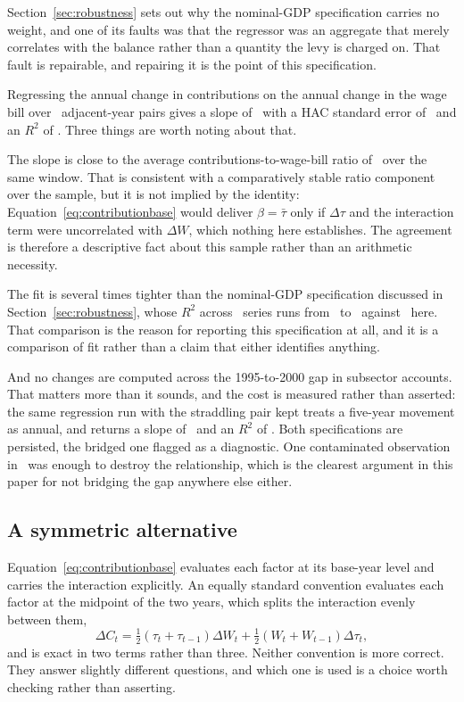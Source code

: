 Section~\ref{sec:robustness} sets out why the nominal-GDP specification carries no weight,
and one of its faults was that the regressor was an aggregate that merely correlates with
the balance rather than a quantity the levy is charged on. That fault is repairable, and
repairing it is the point of this specification.

Regressing the annual change in contributions on the annual change in the wage bill over
\WageBillObservations\ adjacent-year pairs gives a slope of \WageBillSlope\ with a HAC
standard error of \WageBillSlopeSe\ and an $R^2$ of \WageBillRSquared. Three things are
worth noting about that.

The slope is close to the average contributions-to-wage-bill ratio of \RatioMean\
over the same window.
That is consistent with a comparatively stable ratio component over the sample, but it is
not implied by the identity: Equation~\eqref{eq:contributionbase} would deliver
$\beta = \bar{\tau}$ only if $\Delta\tau$ and the interaction term were uncorrelated with
$\Delta W$, which nothing here establishes. The agreement is therefore a descriptive fact
about this sample rather than an arithmetic necessity.

The fit is several times tighter than the nominal-GDP specification discussed in
Section~\ref{sec:robustness}, whose $R^2$ across \GdpRSquaredSeries\ series runs from
\GdpRSquaredLow\ to \GdpRSquaredHigh\ against \WageBillRSquared\ here. That comparison is
the reason for reporting this specification at all, and it is a comparison of fit rather
than a claim that either identifies anything.

And no changes are computed across the 1995-to-2000 gap in subsector accounts. That
matters more than it sounds, and the cost is measured rather than asserted: the same
regression run with the straddling pair kept treats a five-year movement as annual, and
returns a slope of \WageBillSlopeBridged\ and an $R^2$ of \WageBillRSquaredBridged. Both
specifications are persisted, the bridged one flagged as a diagnostic. One contaminated
observation in \WageBillObservations\ was enough to destroy the relationship, which is
the clearest argument in this paper for not bridging the gap anywhere else either.

\subsection{A symmetric alternative}

Equation~\eqref{eq:contributionbase} evaluates each factor at its base-year level and
carries the interaction explicitly. An equally standard convention evaluates each factor
at the midpoint of the two years, which splits the interaction evenly between them,
\[
\Delta C_t = \tfrac{1}{2}\left(\tau_t + \tau_{t-1}\right) \Delta W_t
+ \tfrac{1}{2}\left(W_t + W_{t-1}\right) \Delta \tau_t,
\]
and is exact in two terms rather than three. Neither convention is more correct. They
answer slightly different questions, and which one is used is a choice worth checking
rather than asserting.

